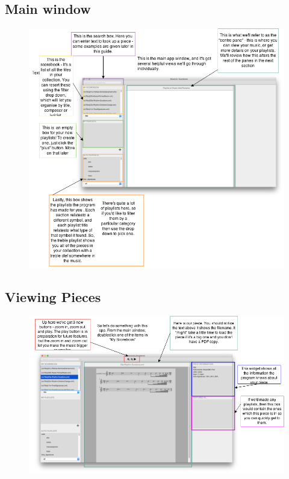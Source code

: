 \subsection{Main window}
\begin{figure}[H]
\centering
\includegraphics[width=500pt]{main_screenshot}	
\end{figure}

\subsection{Viewing Pieces}
\begin{figure}[H]
\centering
\includegraphics[width=500pt]{main_piece}	
\end{figure}

